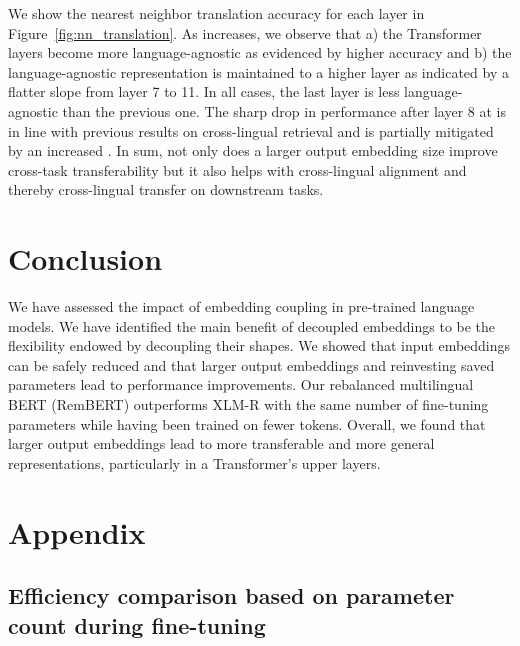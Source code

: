\documentclass{article} \usepackage{iclr2021_conference,times}
\begin{document}
We show the nearest neighbor translation accuracy for each layer in Figure~\ref{fig:nn_translation}. As  increases, we observe that a) the Transformer layers become more language-agnostic as evidenced by higher accuracy and b) the language-agnostic representation is maintained to a higher layer as indicated by a flatter slope from layer 7 to 11. In all cases, the last layer is less language-agnostic than the previous one. The sharp drop in performance after layer 8 at  is in line with previous results on cross-lingual retrieval \citep{Pires2019,Hu2020} and is partially mitigated by an increased . In sum, not only does a larger output embedding size improve cross-task transferability but it also helps with cross-lingual alignment and thereby cross-lingual transfer on downstream tasks.














 



\section{Conclusion}
\label{sec:conclusion}

We have assessed the impact of embedding coupling in pre-trained language models. We have identified the main benefit of decoupled embeddings to be the flexibility endowed by decoupling their shapes. We showed that input embeddings can be safely reduced and that larger output embeddings and reinvesting saved parameters lead to performance improvements. Our rebalanced multilingual BERT (RemBERT) outperforms XLM-R with the same number of fine-tuning parameters while having been trained on  fewer tokens. Overall, we found that larger output embeddings lead to more transferable and more general representations, particularly in a Transformer's upper layers.





\appendix
\section{Appendix}

\subsection{Efficiency comparison based on parameter count during fine-tuning} \label{app:efficiency_comparison}
\end{document}

